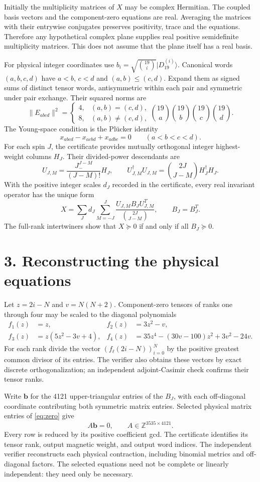 \documentclass[11pt]{article}
\begin{document}
Initially the multiplicity matrices of $X$ may be complex Hermitian. The coupled basis vectors and the component-zero equations are real. Averaging the matrices with their entrywise conjugates preserves positivity, trace and the equations. Therefore any hypothetical complex plane supplies real positive semidefinite multiplicity matrices. This does not assume that the plane itself has a real basis.

For physical integer coordinates use $b_i=\sqrt{\binom{19}{i}}|D_{19}^{(i)}\rangle$. Canonical words $(a,b,c,d)$ have $a<b$, $c<d$ and $(a,b)\le(c,d)$. Expand them as signed sums of distinct tensor words, antisymmetric within each pair and symmetric under pair exchange. Their squared norms are
\[\|E_{abcd}\|^2=\begin{cases}4,&(a,b)=(c,d),\\8,&(a,b)\ne(c,d),\end{cases}\binom{19}{a}\binom{19}{b}\binom{19}{c}\binom{19}{d}.\]
The Young-space condition is the Pl\"ucker identity
\[x_{abcd}-x_{acbd}+x_{adbc}=0\qquad(a<b<c<d).\]
For each spin $J$, the certificate provides mutually orthogonal integer highest-weight columns $H_J$. Their divided-power descendants are
\[U_{J,M}=\frac{J_-^{J-M}}{(J-M)!}H_J,\qquad U_{J,M}^{\dagger}U_{J,M}=\binom{2J}{J-M}H_J^{\dagger}H_J.\]
With the positive integer scales $d_J$ recorded in the certificate, every real invariant operator has the unique form
\[X=\sum_Jd_J\sum_{M=-J}^{J}\frac{U_{J,M}B_JU_{J,M}^{T}}{\binom{2J}{J-M}},\qquad B_J=B_J^T.\]
The full-rank intertwiners show that $X\succeq0$ if and only if all $B_J\succeq0$.

\section*{3. Reconstructing the physical equations}
Let $z=2i-N$ and $v=N(N+2)$. Component-zero tensors of ranks one through four may be scaled to the diagonal polynomials
\begin{align*}
 f_1(z)&=z, & f_2(z)&=3z^2-v,\\
 f_3(z)&=z(5z^2-3v+4), & f_4(z)&=35z^4-(30v-100)z^2+3v^2-24v.
\end{align*}
For each rank divide the vector $(f_\ell(2i-N))_{i=0}^N$ by the positive greatest common divisor of its entries. The verifier also obtains these vectors by exact discrete orthogonalization; an independent adjoint-Casimir check confirms their tensor ranks.

Write $\mathbf b$ for the 4121 upper-triangular entries of the $B_J$, with each off-diagonal coordinate contributing both symmetric matrix entries. Selected physical matrix entries of \eqref{eq:zero} give
\[A\mathbf b=0,\qquad A\in\mathbb Z^{3535\times4121}.\]
Every row is reduced by its positive coefficient gcd. The certificate identifies its tensor rank, output magnetic weight, and output word indices. The independent verifier reconstructs each physical contraction, including binomial metrics and off-diagonal factors. The selected equations need not be complete or linearly independent: they need only be necessary.
\end{document}
